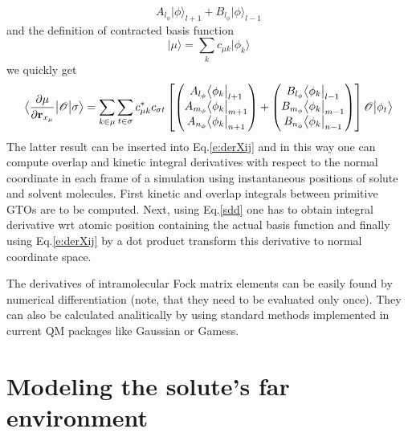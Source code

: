 \documentclass[a4paper,titlepage,twoside,fleqn,12pt]{book}
\newcommand{\bra}[1]{\ensuremath{\bigl\langle {#1} \bigl\lvert}}
\newcommand{\ket}[1]{\ensuremath{\bigr\rvert {#1} \bigr\rangle}}
\newcommand{\tbraket}[3]{\ensuremath{\bigl\langle {#1} \bigl\lvert {#2} \bigl\lvert {#3} \bigr\rangle}}
\newcommand{\fderiv}[2]{\ensuremath{
\frac{\partial #1}{\partial #2}}}
\begin{document}
\begin{refsection}
\begin{equation}
A_{l_\phi}  \ket{\phi}_{l+1} + B_{l_\phi}  \ket{\phi}_{l-1}
\end{equation}
%
and the definition of contracted basis function
%
\begin{equation}\label{muorb}
\ket{\mu} = \sum_k c_{\mu k} \ket{\phi_k}
\end{equation}
%
we quickly get
%
\begin{equation}\label{sdd}
\tbraket{\fderiv{\mu}{{\bf r}_{x_\mu}}}{ \mathscr{O} }{\sigma} =
\sum_{k\in\mu}\sum_{t\in\sigma}
c_{\mu k}^*c_{\sigma t}
  \left[
  \begin{pmatrix}
  A_{l_\phi} \bra{\phi_k}_{l+1} \\ 
  A_{m_\phi} \bra{\phi_k}_{m+1} \\ 
  A_{n_\phi} \bra{\phi_k}_{n+1}
  \end{pmatrix}
+
  \begin{pmatrix}
  B_{l_\phi} \bra{\phi_k}_{l-1} \\ 
  B_{m_\phi} \bra{\phi_k}_{m-1} \\ 
  B_{n_\phi} \bra{\phi_k}_{n-1}
  \end{pmatrix}
  \right]
\mathscr{O}\ket{\phi_t}
\end{equation}
%
The latter result can be inserted into Eq.\eqref{e:derXij} and in this way
one can compute overlap and kinetic integral derivatives with respect to the normal coordinate
in each frame of a simulation using instantaneous positions of solute and solvent molecules.
First kinetic and overlap integrals between primitive GTOs are to be computed. Next,
using Eq.\eqref{sdd} one has to obtain integral derivative wrt atomic position
containing the actual basis function and finally using Eq.\eqref{e:derXij} by a dot product
transform this derivative to normal coordinate space.

The derivatives of intramolecular Fock matrix elements can be easily found
by numerical  differentiation (note, that they need to be evaluated only once).
They can also be calculated analitically by using standard methods implemented
in current QM packages like {\sc Gaussian} or {\sc Gamess}.


\section{Modeling the solute's far environment}


\end{refsection}
\end{document}
